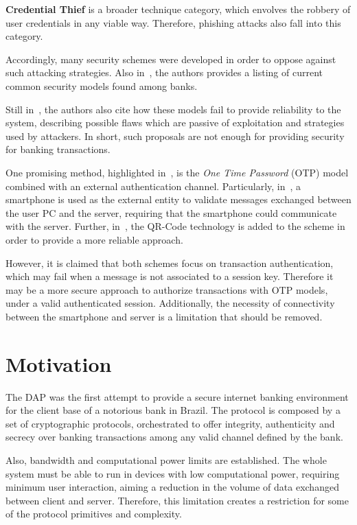 \textbf{Credential Thief} is a broader technique category, which envolves the robbery of user credentials in any viable way. Therefore, phishing attacks also fall into this category.

Accordingly, many security schemes were developed in order to oppose against such attacking strategies. Also in~\cite{Peotta2011, Adham2013}, the authors provides a listing of current common security models found among banks.

Still in~\cite{Peotta2011, Adham2013}, the authors also cite how these models fail to provide reliability to the system, describing possible flaws which are passive of exploitation and strategies used by attackers. In short, such proposals are not enough for providing security for banking transactions.

One promising method, highlighted in~\cite[p.61]{Peotta2012}, is the \textit{One Time Password} (OTP) model combined with an external authentication channel. Particularly, in~\cite{Starnberger2009}, a smartphone is used as the external entity to validate messages exchanged between the user PC and the server, requiring that the smartphone could communicate with the server. Further, in~\cite{LeeHyunLim2010}, the QR-Code technology is added to the scheme in order to provide a more reliable approach.

However, it is claimed that both schemes focus on transaction authentication, which may fail when a message is not associated to a session key. Therefore it may be a more secure approach to authorize transactions with OTP models, under a valid authenticated session. Additionally, the necessity of connectivity between the smartphone and server is a limitation that should be removed.





\section{Motivation}
The DAP was the first attempt to provide a secure internet banking environment for the client base of a notorious bank in Brazil. The protocol is composed by a set of cryptographic protocols, orchestrated to offer integrity, authenticity and secrecy over banking transactions among any valid channel defined by the bank.

Also, bandwidth and computational power limits are established. The whole system must be able to run in devices with low computational power, requiring minimum user interaction, aiming a reduction in the volume of data exchanged between client and server. Therefore, this limitation creates a restriction for some of the protocol primitives and complexity.

